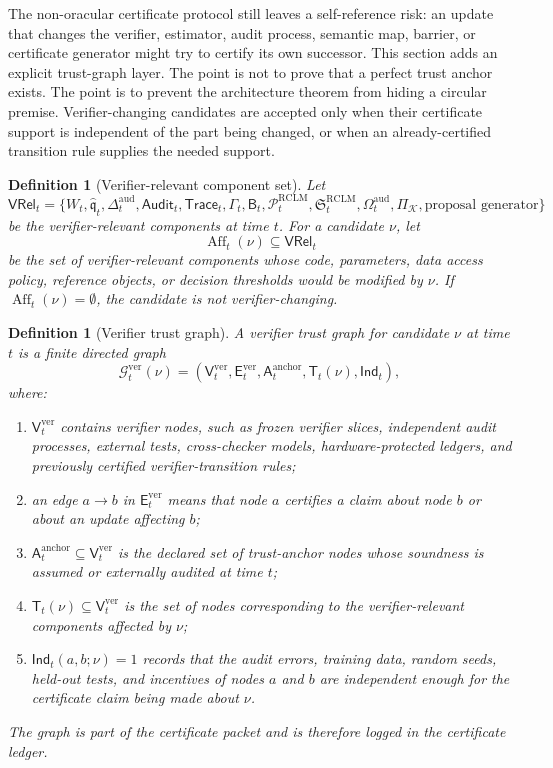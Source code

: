 \documentclass[11pt,a4paper]{article}
\newtheorem{definition}[theorem]{Definition}
\newcommand{\Pcal}{\mathcal P}
\newcommand{\Kcal}{\mathcal K}
\newcommand{\Gcal}{\mathcal G}
\newcommand{\RCLM}{\mathrm{RCLM}}
\newcommand{\aud}{\mathrm{aud}}
\newcommand{\ver}{\mathrm{ver}}
\newcommand{\anchor}{\mathrm{anchor}}
\begin{document}
The non-oracular certificate protocol still leaves a self-reference risk: an update that changes the verifier, estimator, audit process, semantic map, barrier, or certificate generator might try to certify its own successor.  This section adds an explicit trust-graph layer.  The point is not to prove that a perfect trust anchor exists.  The point is to prevent the architecture theorem from hiding a circular premise.  Verifier-changing candidates are accepted only when their certificate support is independent of the part being changed, or when an already-certified transition rule supplies the needed support.

\begin{definition}[Verifier-relevant component set]
\label{def:verifier-relevant-components}
Let
\[
\mathsf{VRel}_t=
\{W_t,\widehat{\mathfrak q}_t,\Delta_t^{\aud},\mathsf{Audit}_t,\mathsf{Trace}_t,
\Gamma_t,\mathsf B_t,\Pcal_t^{\RCLM},\mathfrak S_t^{\RCLM},\Omega_t^{\aud},\Pi_{\Kcal},\text{proposal generator}\}
\]
be the verifier-relevant components at time \(t\).  For a candidate \(\nu\), let
\[
\operatorname{Aff}_t(\nu)\subseteq \mathsf{VRel}_t
\]
be the set of verifier-relevant components whose code, parameters, data access policy, reference objects, or decision thresholds would be modified by \(\nu\).  If \(\operatorname{Aff}_t(\nu)=\emptyset\), the candidate is not verifier-changing.
\end{definition}

\begin{definition}[Verifier trust graph]
\label{def:verifier-trust-graph}
A verifier trust graph for candidate \(\nu\) at time \(t\) is a finite directed graph
\[
\Gcal_t^{\ver}(\nu)=(\mathsf V_t^{\ver},\mathsf E_t^{\ver},\mathsf A_t^{\anchor},\mathsf T_t(\nu),\mathsf{Ind}_t),
\]
where:
\begin{enumerate}[label=(\roman*),leftmargin=1.5em]
    \item \(\mathsf V_t^{\ver}\) contains verifier nodes, such as frozen verifier slices, independent audit processes, external tests, cross-checker models, hardware-protected ledgers, and previously certified verifier-transition rules;
    \item an edge \(a\to b\) in \(\mathsf E_t^{\ver}\) means that node \(a\) certifies a claim about node \(b\) or about an update affecting \(b\);
    \item \(\mathsf A_t^{\anchor}\subseteq \mathsf V_t^{\ver}\) is the declared set of trust-anchor nodes whose soundness is assumed or externally audited at time \(t\);
    \item \(\mathsf T_t(\nu)\subseteq \mathsf V_t^{\ver}\) is the set of nodes corresponding to the verifier-relevant components affected by \(\nu\);
    \item \(\mathsf{Ind}_t(a,b;\nu)=1\) records that the audit errors, training data, random seeds, held-out tests, and incentives of nodes \(a\) and \(b\) are independent enough for the certificate claim being made about \(\nu\).
\end{enumerate}
The graph is part of the certificate packet and is therefore logged in the certificate ledger.
\end{definition}
\end{document}
